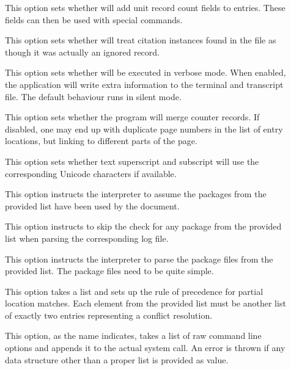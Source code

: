 \begin{description}
\begin{description}
\item[] This option sets whether  will add unit record count fields to entries. These fields can then be used with special commands.

\item[] This option sets whether  will treat citation instances found in the  file as though it was actually an ignored record.

\item[] This option sets whether  will be executed in verbose mode. When enabled, the application will write extra information to the terminal and transcript file. The default behaviour runs in silent mode.

\item[] This option sets whether the program will merge  counter records. If disabled, one may end up with duplicate page numbers in the list of entry locations, but linking to different parts of the page.

\item[] This option sets whether text superscript and subscript will use the corresponding Unicode characters if available.

\item[] This option instructs the interpreter to assume the packages from the provided list have been used by the document.

\item[] This option instructs  to skip the check for any package from the provided list when parsing the corresponding log file.

\item[] This option instructs the interpreter to parse the package files from the provided list. The package files need to be quite simple.

\item[] This option takes a list and sets up the rule of precedence for partial location matches. Each element from the provided list must be another list of exactly two entries representing a conflict resolution.

\item[] This option, as the name indicates, takes a list of raw command line options and appends it to the actual system call. An error is thrown if any data structure other than a proper list is provided as value.
\end{description}


\end{description}
